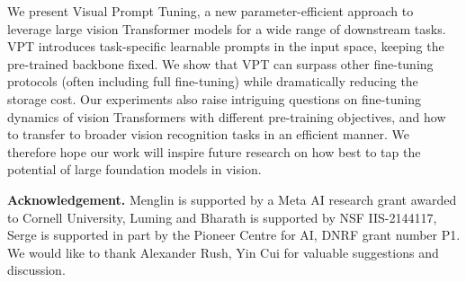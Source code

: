 We present Visual Prompt Tuning, a new parameter-efficient approach to leverage large vision Transformer models for a wide range of downstream tasks. VPT introduces task-specific learnable prompts in the input space, keeping the pre-trained backbone fixed. We show that VPT can surpass other fine-tuning protocols (often including full fine-tuning) while dramatically reducing the storage cost. Our experiments also raise intriguing questions on fine-tuning dynamics of vision Transformers with different pre-training objectives, and how to transfer to broader vision recognition tasks in an efficient manner. We therefore hope our work will inspire future research on how best to tap the potential of large foundation models in vision.

\small{
\textbf{Acknowledgement.}
Menglin is supported by a Meta AI research grant awarded to Cornell University, Luming and Bharath is supported by NSF IIS-2144117, Serge is supported in part by the Pioneer Centre for AI, DNRF grant number P1. We would like to thank Alexander Rush, Yin Cui for valuable suggestions and discussion. }


